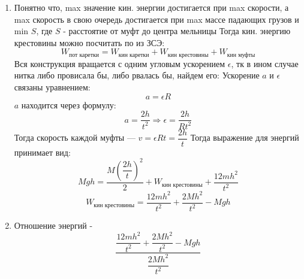 \documentclass[a4paper]{article}
\begin{document}
\begin{enumerate}
	\item Понятно что, max значение кин. энергии достигается при max скорости, а max скорость в свою очередь достигается при max массе падающих грузов и min $S$, где $S$ - расстоятие от муфт до центра мельницы
	Тогда кин. энергию крестовины можно посчитать по из ЗСЭ:
	\begin{equation*}
		W_{\text{пот каретки}}= W_{\text{кин каретки}} + W_{\text{кин крестовины}}+W_{\text{кин муфты}}
	\end{equation*}
	Вся конструкция вращается с одним угловым ускорением $\epsilon$, тк в ином случае нитка либо провисала бы, либо рвалась бы, найдем его:
	Ускорение $a$ и $\epsilon$ связаны уравнением:
	\begin{equation*}
		a=\epsilon R
	\end{equation*}
	$a$ находится через формулу:
	\begin{equation*}
		a=\dfrac{2h}{t^2} \Rightarrow \epsilon = \dfrac{2h}{Rt^2}
	\end{equation*}
	Тогда скорость каждой муфты --- $v=\epsilon Rt = \dfrac{2h}{t}$
	Тогда выражение для энергий принимает вид:
	\begin{equation*}
		Mgh=\dfrac{M \left(\dfrac{2h}{t}\right)^2}{2}+W_{\text{кин крестовины}}+\dfrac{12mh^2}{t^2}
	\end{equation*}
	\begin{equation*}
		W_{\text{кин крестовины}} =\dfrac{12mh^2}{t^2} + \dfrac{2Mh^2}{t^2}-Mgh
	\end{equation*}
\item Отношение энергий - 
	\begin{equation*}
		\dfrac{\dfrac{12mh^2}{t^2} + \dfrac{2Mh^2}{t^2}-Mgh}{\dfrac{2Mh^2}{t^2}}
	\end{equation*}
\end{enumerate}
\end{document}
